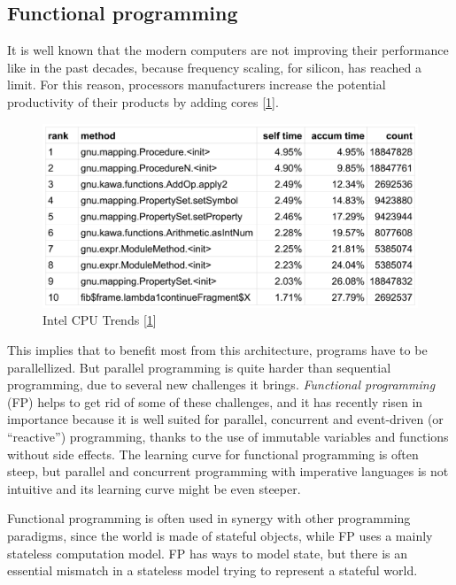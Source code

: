 \documentclass[12pt,a4paper,oneside,openright]{book}
\begin{document}
\subsection{Functional programming}\label{functional-programming}

It is well known that the modern computers are not improving their
performance like in the past decades, because frequency scaling, for
silicon, has reached a limit. For this reason, processors manufacturers
increase the potential productivity of their products by adding cores
{[}\hyperref[ref-TurnConcurrency2015]{1}{]}.

\begin{figure}[htbp]
\centering
\includegraphics{figures/cpu.png}
\caption{Intel CPU Trends {[}\hyperref[ref-TurnConcurrency2015]{1}{]}
\label{cpu-freq}}
\end{figure}

This implies that to benefit most from this architecture, programs have
to be parallellized. But parallel programming is quite harder than
sequential programming, due to several new challenges it brings.
\emph{Functional programming} (FP) helps to get rid of some of these
challenges, and it has recently risen in importance because it is well
suited for parallel, concurrent and event-driven (or ``reactive'')
programming, thanks to the use of immutable variables and functions
without side effects. The learning curve for functional programming is
often steep, but parallel and concurrent programming with imperative
languages is not intuitive and its learning curve might be even steeper.

Functional programming is often used in synergy with other programming
paradigms, since the world is made of stateful objects, while FP uses a
mainly stateless computation model. FP has ways to model state, but
there is an essential mismatch in a stateless model trying to represent
a stateful world.
\end{document}
